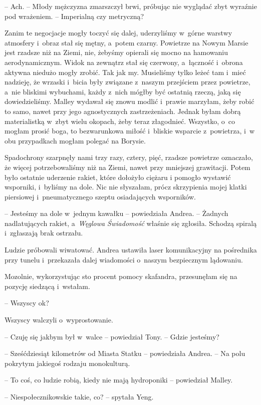 \documentclass[oneside,polish,11pt,sfheadings]{mwbk}
\begin{document}
-- Ach. -- Młody mężczyzna zmarszczył brwi, próbując nie wyglądać zbyt
wyraźnie pod wrażeniem. -- Imperialną czy metryczną?

Zanim te negocjacje mogły toczyć się dalej, uderzyliśmy w~górne warstwy
atmosfery i~obraz stał się mętny, a~potem czarny. Powietrze na Nowym
Marsie jest rzadsze niż na Ziemi, nie, żebyśmy opierali się mocno na
hamowaniu aerodynamicznym. Widok na zewnątrz stał się czerwony, a~łączność i~obrona aktywna niedużo mogły zrobić. Tak jak my. Musieliśmy
tylko leżeć tam i~mieć nadzieję, że wrzaski i~bicia były związane z~naszym przejściem przez powietrze, a~nie bliskimi wybuchami, każdy z~nich mógłby być ostatnią rzeczą, jaką się dowiedzieliśmy. Malley wydawał
się znowu modlić i~prawie marzyłam, żeby robić to samo, nawet przy jego
agnostycznych zastrzeżeniach. Jednak byłam dobrą materialistką w~zbyt
wielu okopach, żeby teraz złagodnieć. Wszystko, o~co mogłam prosić boga,
to bezwarunkowa miłość i~bliskie wsparcie z~powietrza, i~w obu
przypadkach mogłam polegać na Borysie.

Spadochrony szarpnęły nami trzy razy, cztery, pięć, rzadsze powietrze
oznaczało, że więcej potrzebowaliśmy niż na Ziemi, nawet przy mniejszej
grawitacji. Potem było ostatnie uderzenie rakiet, które dołożyło ciężaru
i pomogło wystawić wsporniki, i~byliśmy na dole. Nic nie słyszałam,
prócz skrzypienia mojej klatki piersiowej i~pneumatycznego szeptu
osiadających wsporników.

-- Jesteśmy na dole w~jednym kawałku -- powiedziała Andrea. -- Żadnych
nadlatujących rakiet, a~\textit{Węglowa Świadomość} właśnie się zgłosiła.
Schodzą spiralą i~zgłaszają brak ostrzału.

Ludzie próbowali wiwatować. Andrea ustawiła laser komunikacyjny na
pośrednika przy tunelu i~przekazała dalej wiadomości o~naszym
bezpiecznym lądowaniu.

Mozolnie, wykorzystując sto procent pomocy skafandra, przesunęłam się na
pozycję siedzącą i~wstałam.

-- Wszyscy ok?

Wszyscy walczyli o~wyprostowanie.

-- Czuję się jakbym był w~walce -- powiedział Tony. -- Gdzie jesteśmy?

-- Sześćdziesiąt kilometrów od Miasta Statku -- powiedziała Andrea. -- Na
polu pokrytym jakiegoś rodzaju monokulturą.

-- To coś, co ludzie robią, kiedy nie mają hydroponiki -- powiedział
Malley.

-- Niespołecznikowskie takie, co? -- spytała Yeng.
\end{document}
